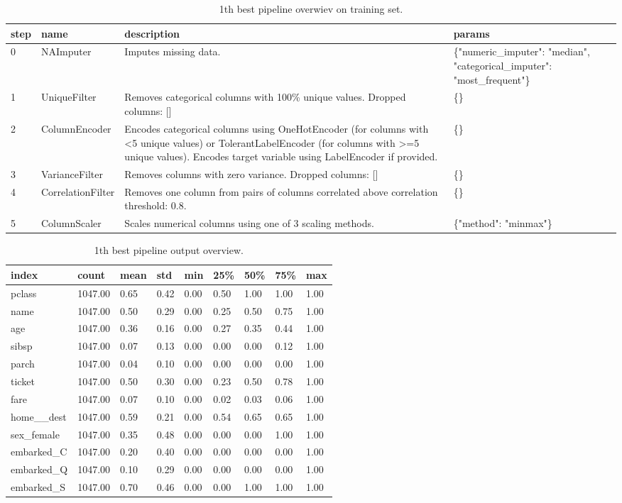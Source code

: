 \documentclass{article}%
\begin{document}
\begin{table}[H]%
\begin{center}%
\begin{tabular}{p{10mm} p{30mm} p{60mm} p{60mm}}%
\hline%
\textbf{step}&\textbf{name}&\textbf{description}&\textbf{params}\\%
\hline%
0&NAImputer&Imputes missing data.&\{"numeric\_imputer": "median", "categorical\_imputer": "most\_frequent"\}\\%
1&UniqueFilter&Removes categorical columns with 100\% unique values. Dropped columns: {[}{]}&\{\}\\%
2&ColumnEncoder&Encodes categorical columns using OneHotEncoder (for columns with <5 unique values) or TolerantLabelEncoder (for columns with >=5 unique values). Encodes target variable using LabelEncoder if provided.&\{\}\\%
3&VarianceFilter&Removes columns with zero variance. Dropped columns: {[}{]}&\{\}\\%
4&CorrelationFilter&Removes one column from pairs of columns correlated above correlation threshold: 0.8.&\{\}\\%
5&ColumnScaler&Scales numerical columns using one of 3 scaling methods.&\{"method": "minmax"\}\\%
\hline%
\end{tabular}%
\end{center}%
\caption{1th best pipeline overwiev on training set.}%
\end{table}

%


\begin{table}[H]%
\begin{center}%
\begin{tabular}{l l l l l l l l l}%
\hline%
\textbf{index}&\textbf{count}&\textbf{mean}&\textbf{std}&\textbf{min}&\textbf{25\%}&\textbf{50\%}&\textbf{75\%}&\textbf{max}\\%
\hline%
pclass&1047.00&0.65&0.42&0.00&0.50&1.00&1.00&1.00\\%
name&1047.00&0.50&0.29&0.00&0.25&0.50&0.75&1.00\\%
age&1047.00&0.36&0.16&0.00&0.27&0.35&0.44&1.00\\%
sibsp&1047.00&0.07&0.13&0.00&0.00&0.00&0.12&1.00\\%
parch&1047.00&0.04&0.10&0.00&0.00&0.00&0.00&1.00\\%
ticket&1047.00&0.50&0.30&0.00&0.23&0.50&0.78&1.00\\%
fare&1047.00&0.07&0.10&0.00&0.02&0.03&0.06&1.00\\%
home\_\_dest&1047.00&0.59&0.21&0.00&0.54&0.65&0.65&1.00\\%
sex\_female&1047.00&0.35&0.48&0.00&0.00&0.00&1.00&1.00\\%
embarked\_C&1047.00&0.20&0.40&0.00&0.00&0.00&0.00&1.00\\%
embarked\_Q&1047.00&0.10&0.29&0.00&0.00&0.00&0.00&1.00\\%
embarked\_S&1047.00&0.70&0.46&0.00&0.00&1.00&1.00&1.00\\%
\hline%
\end{tabular}%
\end{center}%
\caption{1th best pipeline output overview.}%
\end{table}
\end{document}
